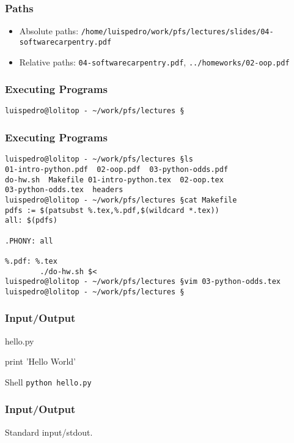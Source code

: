 \begin{frame}[fragile]
\frametitle{Paths}
\begin{itemize}
\item \alert{Absolute paths:} \texttt{/home/luispedro/work/pfs/lectures/slides/04-softwarecarpentry.pdf}
\item \alert{Relative paths:} \texttt{04-softwarecarpentry.pdf}, \texttt{../homeworks/02-oop.pdf}
\end{itemize}
\end{frame}

\begin{frame}[fragile]
\frametitle{Executing Programs}

\begin{verbatim}
luispedro@lolitop - ~/work/pfs/lectures §
\end{verbatim}

\end{frame}

\begin{frame}[fragile]
\frametitle{Executing Programs}

\begin{verbatim}
luispedro@lolitop - ~/work/pfs/lectures §ls
01-intro-python.pdf  02-oop.pdf  03-python-odds.pdf
do-hw.sh  Makefile 01-intro-python.tex  02-oop.tex
03-python-odds.tex  headers
luispedro@lolitop - ~/work/pfs/lectures §cat Makefile
pdfs := $(patsubst %.tex,%.pdf,$(wildcard *.tex))
all: $(pdfs)

.PHONY: all

%.pdf: %.tex
        ./do-hw.sh $<
luispedro@lolitop - ~/work/pfs/lectures §vim 03-python-odds.tex
luispedro@lolitop - ~/work/pfs/lectures §
\end{verbatim}

\end{frame}

\begin{frame}[fragile]
\frametitle{Input/Output}
\begin{block}{hello.py}
\begin{python}
print 'Hello World'
\end{python}
\end{block}

\begin{block}{Shell}
\texttt{python hello.py}
\end{block}
\end{frame}


\begin{frame}[fragile]
\frametitle{Input/Output}
Standard input/stdout.
\end{frame}

